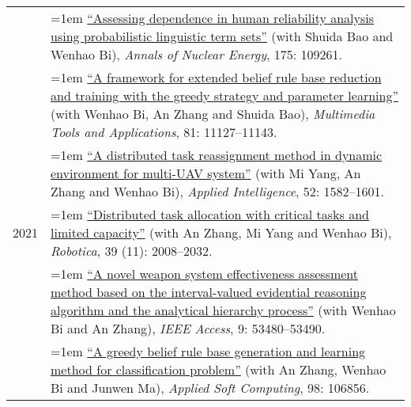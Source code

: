 \documentclass[11pt,english]{article}
\begin{document}
\begin{tabular}{p{.85in}>{\hangindent=1em}p{5.65in}<{\raggedright}}
 &  \href{https://doi.org/10.1016/j.anucene.2022.109261}{``Assessing dependence in human reliability analysis using probabilistic linguistic term sets''} (with Shuida Bao and Wenhao Bi), \textit{Annals of Nuclear Energy}, 175: 109261. \\
 
 &  \href{https://doi.org/10.1007/s11042-022-12232-4}{``A framework for extended belief rule base reduction and training with the greedy strategy and parameter learning''} (with Wenhao Bi, An Zhang and Shuida Bao), \textit{Multimedia Tools and Applications}, 81: 11127--11143. \\
 &  \href{https://doi.org/10.1007/s10489-021-02502-3}{``A distributed task reassignment method in dynamic environment for multi-UAV system''} (with Mi Yang, An Zhang and Wenhao Bi), \textit{Applied Intelligence}, 52: 1582--1601. \\
2021 &  \href{https://doi.org/10.1017/S0263574721000102}{``Distributed task allocation with critical tasks and limited capacity''} (with An Zhang, Mi Yang and Wenhao Bi), \textit{Robotica}, 39 (11): 2008--2032. \\
 &  \href{https://doi.org/10.1109/ACCESS.2021.3071419}{``A novel weapon system effectiveness assessment method based on the interval-valued evidential reasoning algorithm and the analytical hierarchy process''} (with Wenhao Bi and An Zhang), \textit{IEEE Access}, 9: 53480--53490. \\
 &  \href{https://doi.org/10.1016/j.asoc.2020.106856}{``A greedy belief rule base generation and learning method for classification problem''} (with An Zhang, Wenhao Bi and Junwen Ma), \textit{Applied Soft Computing}, 98: 106856. \\
\end{tabular}
\end{document}
